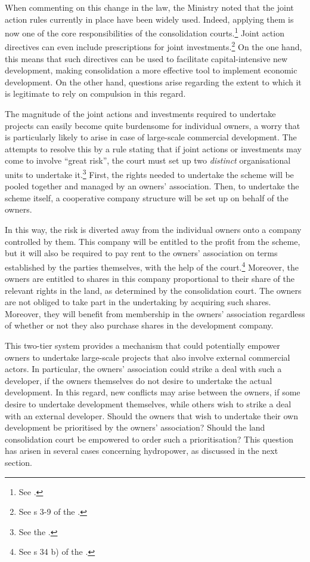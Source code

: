 When commenting on this change in the law, the Ministry noted that the joint action rules currently in place have been widely used. Indeed, applying them is now one of the core responsibilities of the consolidation courts.\footnote{See \cite[146]{prop12}.} Joint action directives can even include prescriptions for joint investments.\footnote{See s 3-9 of the \cite{lca13}.} On the one hand, this means that such directives can be used to facilitate capital-intensive new development, making consolidation a more effective tool to implement economic development. On the other hand, questions arise regarding the extent to which it is legitimate to rely on compulsion in this regard.

The magnitude of the joint actions and investments required to undertake projects can easily become quite burdensome for individual owners, a worry that is particularly likely to arise in case of large-scale commercial development. The \cite{lca79} attempts to resolve this by a rule stating that if joint actions or investments may come to involve ``great risk'', the court must set up two \emph{distinct} organisational units to undertake it.\footnote{See the \cite[34 b)|42]{lca79}.} First, the rights needed to undertake the scheme will be pooled together and managed by an owners' association. Then, to undertake the scheme itself, a cooperative company structure will be set up on behalf of the owners.

In this way, the risk is diverted away from the individual owners onto a company controlled by them. This company will be entitled to the profit from the scheme, but it will also be required to pay rent to the owners' association on terms established by the parties themselves, with the help of the court.\footnote{See s 34 b) of the \cite{lca79}.} Moreover, the owners are entitled to shares in this company proportional to their share of the relevant rights in the land, as determined by the consolidation court. The owners are not obliged to take part in the undertaking by acquiring such shares. Moreover, they will benefit from membership in the owners' association regardless of whether or not they also purchase shares in the development company.

This two-tier system provides a mechanism that could potentially empower owners to undertake large-scale projects that also involve external commercial actors. In particular, the owners' association could  strike a deal with such a developer, if the owners themselves do not desire to undertake the actual development. In this regard, new conflicts may arise between the owners, if some desire to undertake development themselves, while others wish to strike a deal with an external developer. Should the owners that wish to undertake their own development be prioritised by the owners' association? Should the land consolidation court be empowered to order such a prioritisation? This question has arisen in several cases concerning hydropower, as discussed in the next section.


